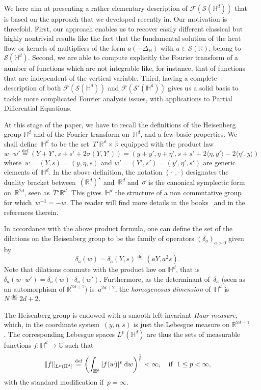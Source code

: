 \documentclass[11pt]{article}
\theoremstyle{definition}
\numberwithin{equation}{section}
\numberwithin{figure}{section}
\numberwithin{table}{section}
\newcommand{\D}{\Delta}
\newcommand*\cF{\mathcal{F}}
\newcommand*\cS{\mathcal{S}}
\newcommand*\bbC{\mathbb{C}}
\newcommand*\R{\mathbb{R}}
\newcommand*\bbH{\mathbb{H}}
\newcommand*\eqdefa{\overset{\mathrm{def}}{=}}
\newcommand*{\dd}{\mathrm{d}}
\newcommand{\dw}{\dd w}
\begin{document}
We here aim at presenting a rather elementary description of $\cF(\cS(\bbH^d))$ that is based on the approach that we developed recently in\cite{bcdFHspace}. Our motivation is threefold. First, our approach enables us to recover easily different classical but highly nontrivial results like the fact that the fundamental solution of the heat flow or kernels of multipliers of the form $a(-\D_\bbH)$ with $a\in\cS(\R)$, belong to $\cS(\bbH^d)$. Second, we are able to compute explicitly the Fourier transform of a number of functions which are not integrable like, for instance, that of functions that are independent of the vertical variable. Third, having a complete description of both $\cF(\cS(\bbH^d))$ and $\cF(\cS'(\bbH^d))$ gives us a solid basis to tackle more complicated Fourier analysis issues, with applications to Partial Differential Equations.

At this stage of the paper, we have to recall the definitions of the Heisenberg group $\bbH^d$ and of the Fourier transform on~$\bbH^d$, and a few basic properties. We shall define~$\bbH^d$ to be the set~$T^\star\R^d \times\R$ equipped with the product law
\[
w\cdot w'\eqdefa
\left(Y+Y', s+s'+ 2\sigma(Y,Y')\right) = \left(y+y', \eta+\eta', s+s'+2 \langle \eta,y'\rangle -2\langle \eta',y\rangle\right)
\]
where~$w=(Y,s)=(y,\eta,s)$ and $w'=(Y',s')=(y',\eta',s')$ are generic elements of~$\bbH^d$. In the above definition, the notation~$\langle{\,\cdot\,,\cdot\,}\rangle$ designates the duality bracket between~$(\R^d)^\star $ and~$\R^d$ and~$\sigma$ is the canonical symplectic form on~$\R^{2d}$, seen as~$T^\star\R^d$. This gives~$\bbH^d$ the structure of a non commutative group for which~$w^{-1}=-w$. The reader will find more details in the books~\cite{bfg, farautharzallah, fisher, folland, follandstein, stein2, taylor1, thangavelu} and in the references therein.

In accordance with the above product formula, one can define the set of the dilations on the Heisenberg group to be the family of operators $(\delta_a)_{a>0}$ given by
\begin{equation}\label{defdilations}
\delta_a(w) = \delta_a (Y,s) \eqdefa (aY,a^2s).
\end{equation}
Note that dilations commute with the product law on $\bbH^d$, that is $\delta_a(w\cdot w') = \delta_a(w) \cdot \delta_a (w')$. Furthermore, as the determinant of~$\delta_a$ (seen as an automorphism of $\R^{2d+1}$) is~$a^{2d+2}$, the \emph{homogeneous dimension} of~$\bbH^d$ is~$N\eqdefa2d+2$.

The Heisenberg group is endowed with a smooth left invariant \emph{Haar measure,} which, in the coordinate system~$(y, \eta, s)$ is just the Lebesgue measure on $\R^{2d+1}$. The corresponding Lebesgue spaces $L^p (\bbH^d)$ are thus the sets of measurable functions $f:\bbH^d\to\bbC$ such that
\[
\|f\|_{L^p (\bbH^d)} \eqdefa \left(\int_{\bbH^d} |f(w)|^p \: \dw \right)^\frac1p<\infty, \quad\hbox{if }\ 1\leq p<\infty,
\]
with the standard modification if~$p=\infty$.
\end{document}
